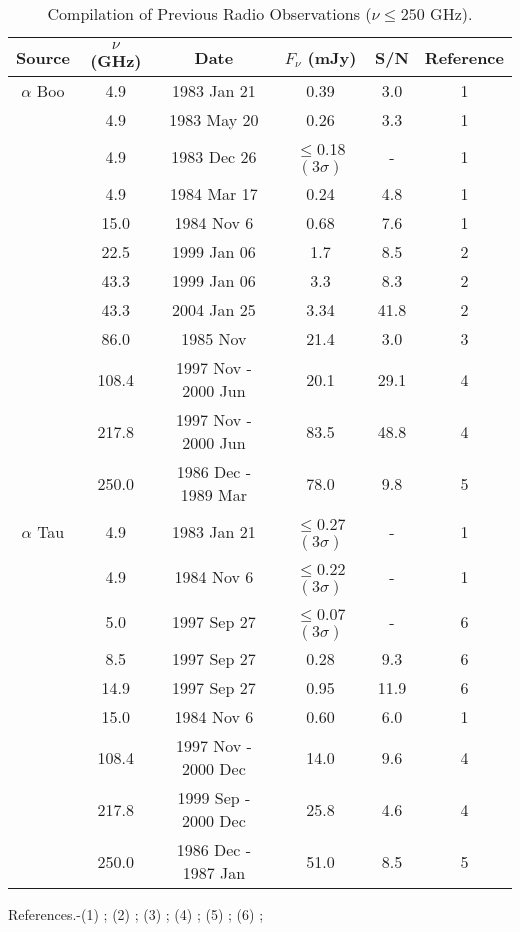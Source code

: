 \begin{table}[!hbt]
\begin{center}
\caption[Compilation of Previous Radio Observations ($\nu \le 250$ GHz)]
{Compilation of Previous Radio Observations ($\nu \le 250$ GHz).}
\begin{tabular}{cccccc}
\hline
\hline
\rule{0pt}{2.5ex}Source & $\nu$ (GHz) & Date &  $F_{\nu}$ (mJy) & S/N & Reference\\
\hline
$\alpha$ Boo &4.9  & 1983 Jan 21 & 0.39 & 3.0 & 1 \\
&4.9  & 1983 May 20 & 0.26 & 3.3& 1 \\
&4.9  & 1983 Dec 26 & $\le$0.18$(3\sigma)$&- & 1 \\
&4.9  & 1984 Mar 17 & 0.24  & 4.8& 1 \\
&15.0 & 1984 Nov 6 & 0.68 & 7.6& 1 \\
&22.5  & 1999 Jan 06  &1.7& 8.5& 2 \\
&43.3  & 1999 Jan 06 & 3.3& 8.3& 2 \\
&43.3  & 2004 Jan 25 & 3.34& 41.8& 2 \\
&86.0  & 1985 Nov  & 21.4& 3.0& 3 \\
&108.4  & 1997 Nov - 2000 Jun & 20.1 &29.1 & 4 \\
&217.8 & 1997 Nov - 2000 Jun  & 83.5 &48.8 & 4 \\
&250.0  & 1986 Dec - 1989 Mar  & 78.0 & 9.8& 5 \\
\hline
\rule{0pt}{3ex}    $\alpha$ Tau	&4.9  & 1983 Jan 21 & $\le$0.27$(3\sigma)$&-& 1 \\
&4.9  & 1984 Nov 6 & $\le$0.22$(3\sigma)$&-& 1 \\
&5.0  & 1997 Sep 27 & $\le$0.07$(3\sigma)$	&-& 6 \\
&8.5  & 1997 Sep 27 & 0.28 	&9.3	& 6 \\
&14.9 & 1997 Sep 27 & 0.95 	&11.9	& 6 \\
&15.0 & 1984 Nov 6 & 0.60 	&6.0	& 1 \\
&108.4  & 1997 Nov - 2000 Dec &  14.0  & 9.6& 4 \\
&217.8 & 1999 Sep - 2000 Dec  & 25.8 & 4.6& 4 \\
&250.0  & 1986 Dec - 1987 Jan & 51.0 & 8.5& 5 \\
\hline
\end{tabular}
\label{tab:6.4.1}
\begin{minipage}{13.5cm}
\rule{0pt}{3ex} References.-(1) \cite{drake_1986}; (2) \cite{dehaes_2011}; (3) \cite{altenhoff_1986}; (4) \cite{cohen_2005}; (5) \cite{altenhoff_1994}; (6) \cite{wood_2007}; 
\end{minipage}
\end{center}
\end{table}

